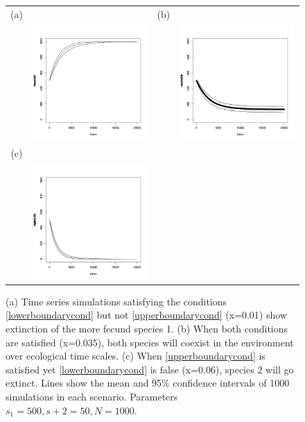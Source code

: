 \documentclass[a4paper]{article}
\begin{document}
\begin{figure}[htbp]
\begin{center}
\begin{tabular}{cccc}
(a)&&(b)&\\
&\includegraphics[width=2.5in]{lowxCIplot.pdf} && \includegraphics[width=2.5in]{medxCIplot.pdf}\\
(c)&&&\\
&\includegraphics[width=2.5in]{highxCIplot.pdf}&& \end{tabular}
\caption{(a) Time series simulations satisfying the conditions \eqref{lowerboundarycond} but not \eqref{upperboundarycond} (x=0.01) show extinction of the more fecund species 1. (b) When both conditions are satisfied (x=0.035), both species will coexist in the environment over ecological time scales. (c) When \eqref{upperboundarycond} is satisfied yet \eqref{lowerboundarycond} is false (x=0.06), species 2 will go extinct. Lines show the mean and 95\% confidence intervals of 1000 simulations in each scenario. Parameters $s_1=500,s+2=50, N=1000$.}
\label{confidenceints}
\end{center}
\end{figure}
\end{document}
